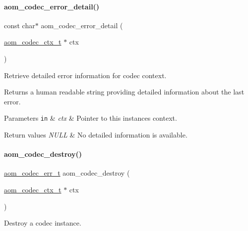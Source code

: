 \paragraph{\texorpdfstring{aom\+\_\+codec\+\_\+error\+\_\+detail()}{aom\_codec\_error\_detail()}}
{\footnotesize\ttfamily const char$\ast$ aom\+\_\+codec\+\_\+error\+\_\+detail (\begin{DoxyParamCaption}\item[{\hyperlink{group__codec_ga9a1d27f9742d9f70783e3c6cb849b5b4}{aom\+\_\+codec\+\_\+ctx\+\_\+t} $\ast$}]{ctx }\end{DoxyParamCaption})}



Retrieve detailed error information for codec context. 

Returns a human readable string providing detailed information about the last error.


\begin{DoxyParams}[1]{Parameters}
\mbox{\tt in}  & {\em ctx} & Pointer to this instance\textquotesingle{}s context.\\
\hline
\end{DoxyParams}

\begin{DoxyRetVals}{Return values}
{\em N\+U\+LL} & No detailed information is available. \\
\hline
\end{DoxyRetVals}
\mbox{\label{group__codec_ga9b60e186f61ba2d6ab2b8069b76a15c5}} 
\paragraph{\texorpdfstring{aom\+\_\+codec\+\_\+destroy()}{aom\_codec\_destroy()}}
{\footnotesize\ttfamily \hyperlink{group__codec_gaaae61e0f8663e6137f1e228757248e7c}{aom\+\_\+codec\+\_\+err\+\_\+t} aom\+\_\+codec\+\_\+destroy (\begin{DoxyParamCaption}\item[{\hyperlink{group__codec_ga9a1d27f9742d9f70783e3c6cb849b5b4}{aom\+\_\+codec\+\_\+ctx\+\_\+t} $\ast$}]{ctx }\end{DoxyParamCaption})}



Destroy a codec instance. 

